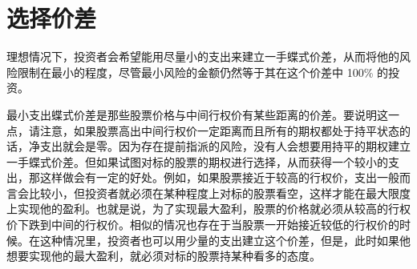 \documentclass{article}
\begin{document}
\section{选择价差}
理想情况下，投资者会希望能用尽量小的支出来建立一手蝶式价差，从而将他的风险限制在最小的程度，尽管最小风险的金额仍然等于其在这个价差中 100\% 的投资。

最小支出蝶式价差是那些股票价格与中间行权价有某些距离的价差。要说明这一点，请注意，如果股票高出中间行权价一定距离而且所有的期权都处于持平状态的话，净支出就会是零。因为存在提前指派的风险，没有人会想要用持平的期权建立一手蝶式价差。但如果试图对标的股票的期权进行选择，从而获得一个较小的支出，那这样做会有一定的好处。例如，如果股票接近于较高的行权价，支出一般而言会比较小，但投资者就必须在某种程度上对标的股票看空，这样才能在最大限度上实现他的盈利。也就是说，为了实现最大盈利，股票的价格就必须从较高的行权价下跌到中间的行权价。相似的情况也存在于当股票一开始接近较低的行权价的时候。在这种情况里，投资者也可以用少量的支出建立这个价差，但是，此时如果他想要实现他的最大盈利，就必须对标的股票持某种看多的态度。
\end{document}
